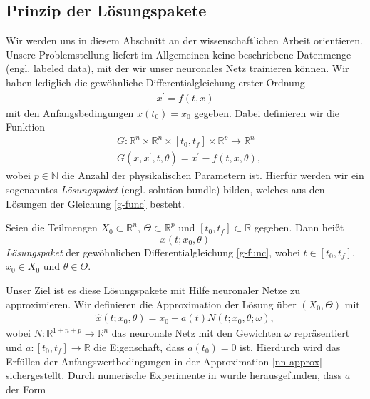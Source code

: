 \subsection{Prinzip der Lösungspakete}
\label{subsec:lsgpakete}
Wir werden uns in diesem Abschnitt an der wissenschaftlichen Arbeit \cite{flamantSolvingDifferentialEquations2020}
orientieren. Unsere Problemstellung liefert im Allgemeinen keine beschriebene Datenmenge (engl. labeled data), mit der
wir unser neuronales Netz trainieren können. Wir haben lediglich die gewöhnliche Differentialgleichung erster Ordnung
\begin{align}
    \label{dgl-machinelearnung}
    x^{\prime} = f(t,x)
\end{align}
mit den Anfangsbedingungen $x(t_0)=x_0$ gegeben. Dabei definieren wir die Funktion
\begin{align}
    \label{g-func}
    &G:\mathbb{R}^n \times \mathbb{R}^n \times [t_0, t_f] \times \mathbb{R}^p \rightarrow \mathbb{R}^n \nonumber\\
    &G \left( x, x^{\prime}, t, \theta \right) = x^{\prime} - f(t, x, \theta),
\end{align}
wobei $p \in \mathbb{N}$ die Anzahl der physikalischen Parametern ist. Hierfür werden wir ein sogenanntes
\textit{Lösungspaket} (engl. solution bundle) bilden, welches aus den Lösungen der Gleichung \eqref{g-func} besteht.
\begin{definition}
    \label{sol-bundle}
    Seien die Teilmengen $X_0 \subset \mathbb{R}^n$, $\Theta \subset \mathbb{R}^p$ und $[t_0,t_f] \subset \mathbb{R}$
    gegeben. Dann heißt
    \[
        x(t;x_0, \theta)
    \]
    {\em Lösungspaket} der gewöhnlichen Differentialgleichung \eqref{g-func}, wobei $t \in [t_0,t_f]$, $x_0 \in X_0$ und
    $\theta \in \Theta$.
\end{definition}
Unser Ziel ist es diese Lösungspakete mit Hilfe neuronaler Netze zu approximieren. Wir definieren die Approximation der
Lösung über $(X_0,\Theta)$ mit
\begin{align}
    \label{nn-approx}
    \hat{x}(t;x_0, \theta) = x_0 + a(t) N(t; x_0, \theta; \omega),
\end{align}
wobei $N:\mathbb{R}^{1+n+p} \rightarrow \mathbb{R}^n$ das neuronale Netz mit den Gewichten $\omega$ repräsentiert und
$a:[t_0,t_f] \rightarrow \mathbb{R}$ die Eigenschaft, dass $a(t_0)=0$ ist. Hierdurch wird das Erfüllen der
Anfangswertbedingungen in der Approximation \eqref{nn-approx} sichergestellt. Durch numerische Experimente in
\cite{flamantSolvingDifferentialEquations2020} wurde herausgefunden, dass $a$ der Form
